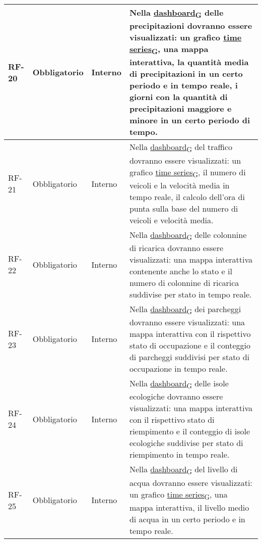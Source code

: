 \begin{longtable}{|>{\centering\arraybackslash}m{}|>{\centering\arraybackslash}m{}|>{\centering\arraybackslash}m{}|>{\centering\arraybackslash}m{}|}
	\\\hline
	RF-20           & Obbligatorio        & Interno        & Nella \href{https://7last.github.io/docs/rtb/documentazione-interna/glossario\#dashboard}{dashboard\textsubscript{G}} delle precipitazioni dovranno essere visualizzati: un grafico \href{https://7last.github.io/docs/rtb/documentazione-interna/glossario\#time-series}{time series\textsubscript{G}}, una mappa interattiva, la quantità media di precipitazioni in un certo periodo e in tempo reale, i giorni con la quantità di precipitazioni maggiore e minore in un certo periodo di tempo.
	\\\hline
	RF-21           & Obbligatorio        & Interno        & Nella \href{https://7last.github.io/docs/rtb/documentazione-interna/glossario\#dashboard}{dashboard\textsubscript{G}} del traffico dovranno essere visualizzati: un grafico \href{https://7last.github.io/docs/rtb/documentazione-interna/glossario\#time-series}{time series\textsubscript{G}}, il numero di veicoli e la velocità media in tempo reale, il calcolo dell'ora di punta sulla base del numero di veicoli e velocità media.
	\\\hline
	RF-22           & Obbligatorio        & Interno        & Nella \href{https://7last.github.io/docs/rtb/documentazione-interna/glossario\#dashboard}{dashboard\textsubscript{G}} delle colonnine di ricarica dovranno essere visualizzati: una mappa interattiva contenente anche lo stato e il numero di colonnine di ricarica suddivise per stato in tempo reale.
	\\\hline
	RF-23           & Obbligatorio        & Interno        & Nella \href{https://7last.github.io/docs/rtb/documentazione-interna/glossario\#dashboard}{dashboard\textsubscript{G}} dei parcheggi dovranno essere visualizzati: una mappa interattiva con il rispettivo stato di occupazione e il conteggio di parcheggi suddivisi per stato di occupazione in tempo reale.
	\\\hline
	RF-24           & Obbligatorio        & Interno        & Nella \href{https://7last.github.io/docs/rtb/documentazione-interna/glossario\#dashboard}{dashboard\textsubscript{G}} delle isole ecologiche dovranno essere visualizzati: una mappa interattiva con il rispettivo stato di riempimento e il conteggio di isole ecologiche suddivise per stato di riempimento in tempo reale.
	\\\hline
	RF-25           & Obbligatorio        & Interno        & Nella \href{https://7last.github.io/docs/rtb/documentazione-interna/glossario\#dashboard}{dashboard\textsubscript{G}} del livello di acqua dovranno essere visualizzati: un grafico \href{https://7last.github.io/docs/rtb/documentazione-interna/glossario\#time-series}{time series\textsubscript{G}}, una mappa interattiva, il livello medio di acqua in un certo periodo e in tempo reale.

\end{longtable}
